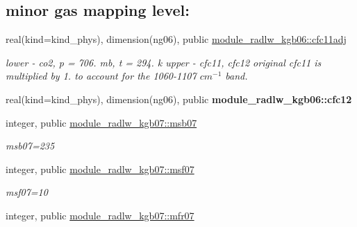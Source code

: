 \subsection*{minor gas mapping level\+:}
\begin{DoxyCompactItemize}
\item 
\mbox{\label{group__module__radlw__kgbnn_ga8b0813723ba69b1afbe2552f6b730267}} 
real(kind=kind\+\_\+phys), dimension(ng06), public \hyperlink{group__module__radlw__kgbnn_ga8b0813723ba69b1afbe2552f6b730267}{module\+\_\+radlw\+\_\+kgb06\+::cfc11adj}
\begin{DoxyCompactList}\small\item\em lower -\/ co2, p = 706. mb, t = 294. k upper -\/ cfc11, cfc12 original cfc11 is multiplied by 1. to account for the 1060-\/1107 $cm^{-1}$ band. \end{DoxyCompactList}\item 
\mbox{\label{group__module__radlw__kgbnn_ga44f5934520edc537b5df004774b0ef71}} 
real(kind=kind\+\_\+phys), dimension(ng06), public {\bfseries module\+\_\+radlw\+\_\+kgb06\+::cfc12}
\item 
\mbox{\label{group__module__radlw__kgbnn_gabba2139dfc5d8551f844f3809c28ce3c}} 
integer, public \hyperlink{group__module__radlw__kgbnn_gabba2139dfc5d8551f844f3809c28ce3c}{module\+\_\+radlw\+\_\+kgb07\+::msb07}
\begin{DoxyCompactList}\small\item\em msb07=235 \end{DoxyCompactList}\item 
\mbox{\label{group__module__radlw__kgbnn_ga9310f33501467fbadcf092d71559358b}} 
integer, public \hyperlink{group__module__radlw__kgbnn_ga9310f33501467fbadcf092d71559358b}{module\+\_\+radlw\+\_\+kgb07\+::msf07}
\begin{DoxyCompactList}\small\item\em msf07=10 \end{DoxyCompactList}\item 
\mbox{\label{group__module__radlw__kgbnn_ga0bd5d550553238ae13cbf57423d102c8}} 
integer, public \hyperlink{group__module__radlw__kgbnn_ga0bd5d550553238ae13cbf57423d102c8}{module\+\_\+radlw\+\_\+kgb07\+::mfr07}

\end{DoxyCompactItemize}

